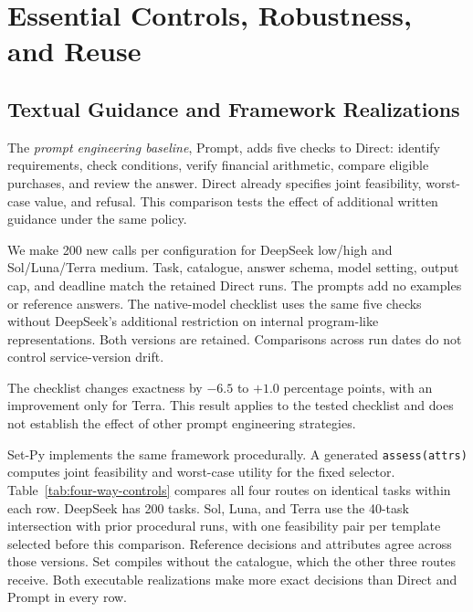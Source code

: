 \section{Essential Controls, Robustness, and Reuse}
\label{app:execution}
\subsection{Textual Guidance and Framework Realizations}
\label{app:prompt-controls}
The \emph{prompt engineering baseline}, Prompt, adds five checks to Direct: identify requirements, check conditions, verify financial arithmetic, compare eligible purchases, and review the answer. Direct already specifies joint feasibility, worst-case value, and refusal. This comparison tests the effect of additional written guidance under the same policy.

We make 200 new calls per configuration for DeepSeek low/high and Sol/Luna/Terra medium. Task, catalogue, answer schema, model setting, output cap, and deadline match the retained Direct runs. The prompts add no examples or reference answers. The native-model checklist uses the same five checks without DeepSeek's additional restriction on internal program-like representations. Both versions are retained. Comparisons across run dates do not control service-version drift.

\begin{table}[!tbp]
\centering\small\setlength{\tabcolsep}{7pt}

\caption{\textbf{Additional prompt engineering on the primary tasks.} Direct and Prompt are exact-decision percentages on the same 200 tasks per configuration; $\Delta$ is Prompt minus Direct in percentage points. Prompt U/R/O reports unsafe acceptance, false refusal, and other errors. Every new call remains in the denominator.}
\label{tab:prompt-control}
\end{table}

The checklist changes exactness by $-6.5$ to $+1.0$ percentage points, with an improvement only for Terra. This result applies to the tested checklist and does not establish the effect of other prompt engineering strategies.

Set-Py implements the same framework procedurally. A generated \texttt{assess(attrs)} computes joint feasibility and worst-case utility for the fixed selector. Table~\ref{tab:four-way-controls} compares all four routes on identical tasks within each row. DeepSeek has 200 tasks. Sol, Luna, and Terra use the 40-task intersection with prior procedural runs, with one feasibility pair per template selected before this comparison. Reference decisions and attributes agree across those versions. Set compiles without the catalogue, which the other three routes receive. Both executable realizations make more exact decisions than Direct and Prompt in every row.

